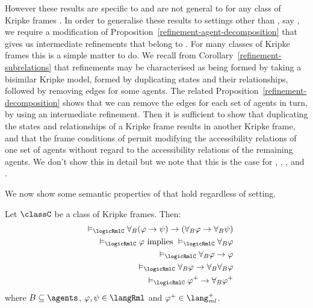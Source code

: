 However these results are specific to \logicRmlK{} and are not general to \logicRmlC{} for any class of Kripke frames \classC{}.
In order to generalise these results to settings other than \classK{}, say \classC{}, we require a modification of Proposition~\ref{refinement-agent-decomposition} that gives us intermediate refinements that belong to \classC{}.
For many classes of Kripke frames this is a simple matter to do.
We recall from Corollary~\ref{refinement-subrelations} that refinements may be characterised as being formed by taking a bisimilar Kripke model, formed by duplicating states and their relationships, followed by removing edges for some agents.
The related Proposition~\ref{refinement-decomposition} shows that we can remove the edges for each set of agents in turn, by using an intermediate refinement.
Then it is sufficient to show that duplicating the states and relationships of a \classC{} Kripke frame results in another \classC{} Kripke frame, and that the frame conditions of \classC{} permit modifying the accessibility relations of one set of agents without regard to the accessibility relations of the remaining agents.
We don't show this in detail but we note that this is the case for \classK{}, \classKF{}, \classKFF{}, \classKD{} and \classS{}.

We now show some semantic properties of \logicRml{} that hold regardless of setting.

\begin{proposition}\label{rml-validities}
Let $\classC$ be a class of Kripke frames. Then:
\begin{eqnarray}
    &&\entails_\logicRmlC \allrefsBs (\phi \implies \psi) \implies (\allrefsBs \phi \implies \allrefsBs \psi) \label{rml-validity-r}\\
    &&\entails_\logicRmlC \phi \text{ implies } \entails_\logicRmlC \allrefsBs \phi \label{rml-validity-necr}\\
    &&\entails_\logicRmlC \allrefsBs \phi \implies \phi \label{rml-validity-rt}\\
    &&\entails_\logicRmlC \allrefsBs \phi \implies \allrefsBs \allrefsBs \phi \label{rml-validity-r4}\\
    &&\entails_\logicRmlC \phi^+ \implies \allrefsBs \phi^+ \label{rml-validity-rp}
\end{eqnarray}
where $\agentsB \subseteq \agents$, $\phi, \psi \in \langRml$ and $\phi^+ \in \langMlPlus$.
\end{proposition}

